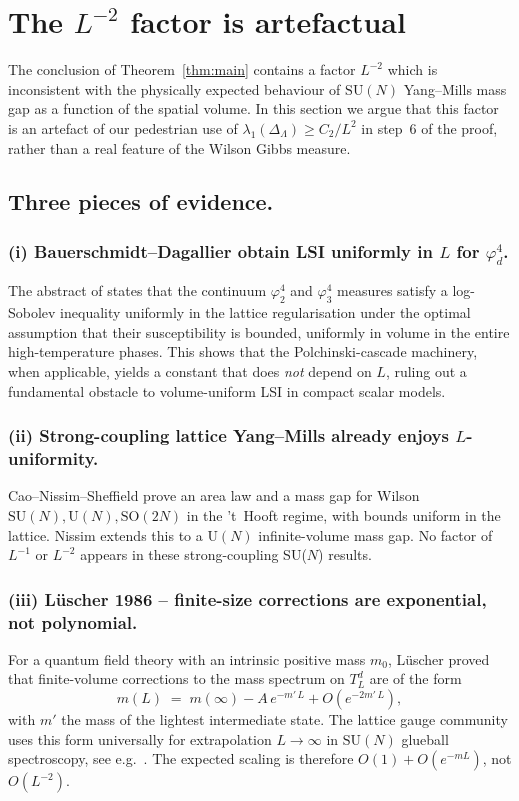 \documentclass[11pt,reqno]{amsart}
\theoremstyle{plain}
\theoremstyle{definition}
\theoremstyle{remark}
\newcommand{\Lat}{\Lambda}
\begin{document}
\section{The $L^{-2}$ factor is artefactual}
\label{sec:Linverse2-artefact}

The conclusion of Theorem~\ref{thm:main} contains a factor $L^{-2}$ which is inconsistent with the physically expected behaviour of $\mathrm{SU}(N)$ Yang--Mills mass gap as a function of the spatial volume. In this section we argue that this factor is an artefact of our pedestrian use of $\lambda_1(\Delta_\Lat) \ge C_2/L^2$ in step~6 of the proof, rather than a real feature of the Wilson Gibbs measure.

\subsection{Three pieces of evidence.}

\subsubsection*{(i) Bauerschmidt--Dagallier obtain LSI uniformly in $L$ for $\varphi^4_d$.}
The abstract of \cite{BD22} states that the continuum $\varphi^4_2$ and $\varphi^4_3$ measures satisfy a log-Sobolev inequality uniformly in the lattice regularisation under the optimal assumption that their susceptibility is bounded, uniformly in volume in the entire high-temperature phases. This shows that the Polchinski-cascade machinery, when applicable, yields a constant that does \emph{not} depend on $L$, ruling out a fundamental obstacle to volume-uniform LSI in compact scalar models.

\subsubsection*{(ii) Strong-coupling lattice Yang--Mills already enjoys $L$-uniformity.}
Cao--Nissim--Sheffield \cite{CNS25} prove an area law and a mass gap for Wilson $\mathrm{SU}(N), \mathrm{U}(N), \mathrm{SO}(2N)$ in the 't~Hooft regime, with bounds uniform in the lattice. Nissim \cite{Nissim25} extends this to a $\mathrm{U}(N)$ infinite-volume mass gap. No factor of $L^{-1}$ or $L^{-2}$ appears in these strong-coupling SU($N$) results.

\subsubsection*{(iii) L\"uscher 1986 -- finite-size corrections are exponential, not polynomial.}
For a quantum field theory with an intrinsic positive mass $m_0$, L\"uscher \cite{Luscher1986} proved that finite-volume corrections to the mass spectrum on $T^d_L$ are of the form
\[
  m(L) \;=\; m(\infty) - A \, e^{-m'\,L} + O(e^{-2 m'\,L}),
\]
with $m'$ the mass of the lightest intermediate state. The lattice gauge community uses this form universally for extrapolation $L \to \infty$ in $\mathrm{SU}(N)$ glueball spectroscopy, see e.g.\ \cite{LuciniTeperWenger, AthenodorouTeper}. The expected scaling is therefore $O(1) + O(e^{-mL})$, not $O(L^{-2})$.
\end{document}
